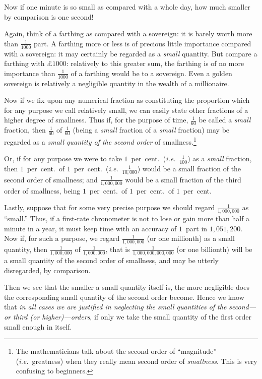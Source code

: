 \documentclass[12pt]{book}[2005/09/16]
\newcommand{\DPPageSep}[2]{\Pagelabel{#2}}
\newcommand{\Pagelabel}[1]
  {\phantomsection\label{#1}}
\newcommand{\IE}{\textit{i.e.}}
\begin{document}
Now if one minute is so small as compared with a
whole day, how much smaller by comparison is one
second!

Again, think of a farthing as compared with a
sovereign: it is barely worth more than $\frac{1}{1000}$ part.
A farthing more or less is of precious little importance
compared with a sovereign: it may certainly be regarded
as a \emph{small} quantity. But compare a farthing
with £$1000$: relatively to this greater sum, the
farthing is of no more importance than $\frac{1}{1000}$ of a
farthing would be to a sovereign. Even a golden
sovereign is relatively a negligible quantity in the
wealth of a millionaire.

Now if we fix upon any numerical fraction as
constituting the proportion which for any purpose
we call relatively small, we can easily state other
fractions of a higher degree of smallness. Thus if,
for the purpose of time, $\frac{1}{60}$ be called a \emph{small} fraction,
then $\frac{1}{60}$ of $\frac{1}{60}$ (being a \emph{small} fraction of a \emph{small}
fraction) may be regarded as a \emph{small quantity of the
second order}\Pagelabel{smallness} of smallness.\footnote
  {The mathematicians talk about the second order of ``magnitude''
  (\IE~greatness) when they really mean second order of \emph{smallness}.
  This is very confusing to beginners.}

Or, if for any purpose we were to take $1$~per~cent.\
(\IE~$\frac{1}{100}$) as a \emph{small} fraction, then $1$~per~cent.\ of
$1$~per~cent.\ (\IE~$\frac{1}{10,000}$) would be a small fraction
of the second order of smallness; and $\frac{1}{1,000,000}$ would
\DPPageSep{017.png}{5}%
be a small fraction of the third order of smallness,
being $1$~per~cent.\ of $1$~per~cent.\ of $1$~per~cent.

Lastly, suppose that for some very precise purpose
we should regard $\frac{1}{1,000,000}$ as ``small.'' Thus, if a
first-rate chronometer is not to lose or gain more than
half a minute in a year, it must keep time with an
accuracy of $1$~part in $1,051,200$. Now if, for such a
purpose, we regard $\frac{1}{1,000,000}$ (or one millionth) as a
small quantity, then $\frac{1}{1,000,000}$ of $\frac{1}{1,000,000}$, that is
$\frac{1}{1,000,000,000,000}$ (or one billionth) will be a small
quantity of the second order of smallness, and may
be utterly disregarded, by comparison.

Then we see that the smaller a small quantity itself
is, the more negligible does the corresponding small
quantity of the second order become. Hence we
know that \emph{in all cases we are justified in neglecting
the small quantities of the second---or third \emph{(or
higher)}---orders}, if only we take the small quantity
of the first order small enough in itself.
\end{document}
